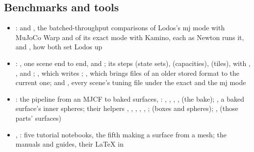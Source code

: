 \subsection{Benchmarks and tools}\label{sec:tools}

\begin{itemize}[nosep,leftmargin=*]
\small
\item {}:  and , the batched-throughput comparisons of Lodos's mj mode with MuJoCo Warp and of its exact mode with Kamino, each as Newton runs it, and , how both set Lodos up
\item {}: , one scene end to end, and ; its steps  (state sets),  (capacities),  (tiles), with , ,  and ; , which writes ; , which brings files of an older stored format to the current one;  and , every scene's tuning file under the exact and the mj mode
\item {}: the pipeline from an MJCF to baked surfaces, : , , , ,  (the bake); , a baked surface's inner spheres; their helpers , , , , , ;  (boxes and spheres); ,  (those parts' surfaces)
\item {}, : five tutorial notebooks, the fifth making a surface from a mesh; the manuals and guides, their LaTeX in 
\end{itemize}


